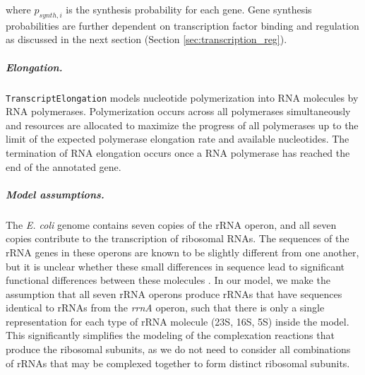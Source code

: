\documentclass[12pt]{article}
\begin{document}
\noindent where $p_{synth, i}$ is the synthesis probability for each gene. Gene synthesis probabilities are further dependent on transcription factor binding and regulation as discussed in the next section (Section \ref{sec:transcription_reg}).

\subparagraph{Elongation.}
\texttt{TranscriptElongation} models nucleotide polymerization into RNA molecules by RNA polymerases. Polymerization occurs across all polymerases simultaneously and resources are allocated to maximize the progress of all polymerases up to the limit of the expected polymerase elongation rate and available nucleotides. The termination of RNA elongation occurs once a RNA polymerase has reached the end of the annotated gene. \\

\subparagraph{Model assumptions.}
The \emph{E. coli} genome contains seven copies of the rRNA operon, and all seven copies contribute to the transcription of ribosomal RNAs. The sequences of the rRNA genes in these operons are known to be slightly different from one another, but it is unclear whether these small differences in sequence lead to significant functional differences between these molecules \cite{maeda2015strength}. In our model, we make the assumption that all seven rRNA operons produce rRNAs that have sequences identical to rRNAs from the \emph{rrnA} operon, such that there is only a single representation for each type of rRNA molecule (23S, 16S, 5S) inside the model. This significantly simplifies the modeling of the complexation reactions that produce the ribosomal subunits, as we do not need to consider all combinations of rRNAs that may be complexed together to form distinct ribosomal subunits.
\end{document}
